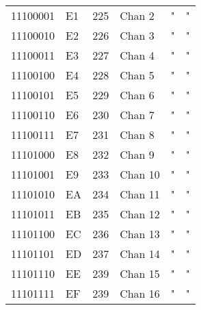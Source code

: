 \begin{center}
\begin{supertabular}{| C{2cm} | C{1.5cm} | C{1.5cm} | C{5.3cm} | C{1.5cm} | C{1.5cm} |}
                11100001 & E1 & 225 & Chan 2   &                   "                              &                   "                            \\
             11100010 & E2 & 226 & Chan 3   &                   "                              &                   "                            \\
                11100011 & E3 & 227 & Chan 4   &                   "                              &                   "                            \\
             11100100 & E4 & 228 & Chan 5   &                   "                              &                   "                            \\
                11100101 & E5 & 229 & Chan 6   &                   "                              &                   "                            \\
             11100110 & E6 & 230 & Chan 7   &                   "                              &                   "                            \\
                11100111 & E7 & 231 & Chan 8   &                   "                              &                   "                            \\
             11101000 & E8 & 232 & Chan 9   &                   "                              &                   "                            \\
                11101001 & E9 & 233 & Chan 10  &                   "                              &                   "                            \\
             11101010 & EA & 234 & Chan 11  &                   "                              &                   "                            \\
                11101011 & EB & 235 & Chan 12  &                   "                              &                   "                            \\
             11101100 & EC & 236 & Chan 13  &                   "                              &                   "                            \\
                11101101 & ED & 237 & Chan 14  &                   "                              &                   "                            \\
             11101110 & EE & 239 & Chan 15  &                   "                              &                   "                            \\
                11101111 & EF & 239 & Chan 16  &                   "                              &                   "                            \\
        \end{supertabular}
        \end{center}

